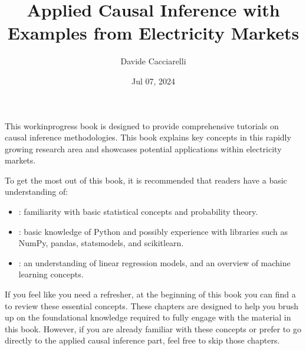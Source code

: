 \documentclass[letterpaper,10pt,english]{jupyterBook}
\title{Applied Causal Inference with Examples from Electricity Markets}
\date{Jul 07, 2024}
\author{Davide Cacciarelli}
\begin{document}
\pagestyle{empty}
\sphinxmaketitle
\pagestyle{plain}
\sphinxtableofcontents
\pagestyle{normal}
\label{\detokenize{intro::doc}}


\sphinxAtStartPar
This work\sphinxhyphen{}in\sphinxhyphen{}progress book is designed to provide comprehensive tutorials on causal inference methodologies. This book explains key concepts in this rapidly growing research area and showcases potential applications within electricity markets.

\sphinxAtStartPar
{}

\sphinxAtStartPar
To get the most out of this book, it is recommended that readers have a basic understanding of:
\begin{itemize}
\item {} 
\sphinxAtStartPar
{}: familiarity with basic statistical concepts and probability theory.

\item {} 
\sphinxAtStartPar
{}: basic knowledge of Python and possibly experience with libraries such as NumPy, pandas, statsmodels, and scikit\sphinxhyphen{}learn.

\item {} 
\sphinxAtStartPar
{}: an understanding of linear regression models, and an overview of machine learning concepts.

\end{itemize}

\sphinxAtStartPar
If you feel like you need a refresher, at the beginning of this book you can find a  to review these essential concepts. These chapters are designed to help you brush up on the foundational knowledge required to fully engage with the material in this book. However, if you are already familiar with these concepts or prefer to go directly to the applied causal inference part, feel free to skip those chapters.

\sphinxAtStartPar
{}
\end{document}
